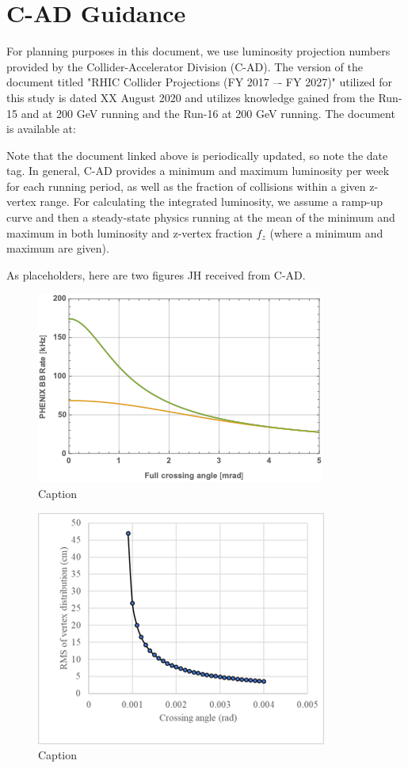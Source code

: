 \chapter{C-AD Guidance}
\label{chap:cad}

For planning purposes in this document, we use luminosity projection numbers provided by the Collider-Accelerator Division (C-AD).   The version of the document titled 
"RHIC Collider Projections (FY 2017 –- FY 2027)" utilized for this study is dated XX August 2020 and utilizes knowledge gained from the Run-15 \pp and \pau at 200 GeV running and the Run-16 \auau at 200 GeV running.   The document is available at:

\bigskip
{\color{blue}{http://www.rhichome.bnl.gov/RHIC/Runs/RhicProjections.pdf}} 
\bigskip

Note that the document linked above is periodically updated, so note the date tag.  In general, C-AD provides a minimum and maximum luminosity per week for each running period, as well as the fraction of collisions within a given z-vertex range. For calculating the integrated luminosity, we assume a ramp-up curve and then a steady-state physics running at the mean of the minimum and maximum in both luminosity and z-vertex fraction $f_{z}$ (where a minimum and maximum are given).   

As placeholders, here are two figures JH received from C-AD.

\begin{figure}
    \centering
    \includegraphics[width=0.8\linewidth]{figs/figure_cad1_prelim.png}
    \caption{Caption}
    \label{fig:cad1}
\end{figure}

\begin{figure}
    \centering
    \includegraphics[width=0.8\linewidth]{figs/figure_cad2_prelim.png}
    \caption{Caption}
    \label{fig:cad2}
\end{figure}
